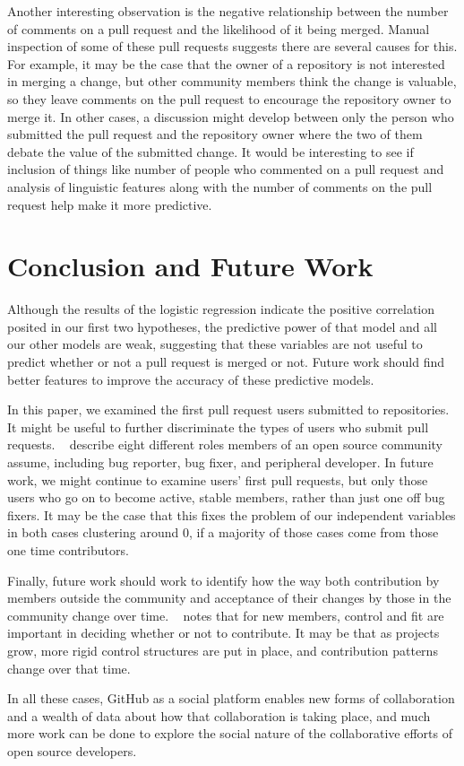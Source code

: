 \documentclass[12pt]{article}
\begin{document}
Another interesting observation is the negative relationship between the number
of comments on a pull request and the likelihood of it being merged. Manual
inspection of some of these pull requests suggests there are several causes for
this. For example, it may be the case that the owner of a repository is not
interested in merging a change, but other community members think the change is
valuable, so they leave comments on the pull request to encourage the repository
owner to merge it. In other cases, a discussion might develop between only the
person who submitted the pull request and the repository owner where the two of
them debate the value of the submitted change. It would be interesting to see if
inclusion of things like number of people who commented on a pull request and
analysis of linguistic features along with the number of comments on the pull
request help make it more predictive.

\section{Conclusion and Future Work}\label{conclusion}
Although the results of the logistic regression indicate the positive
correlation posited in our first two hypotheses, the predictive power of that
model and all our other models are weak, suggesting that these variables are
not useful to predict whether or not a pull request is merged or not. Future
work should find better features to improve the accuracy of these predictive
models.

In this paper, we examined the first pull request users submitted to
repositories. It might be useful to further discriminate the types of users who
submit pull requests. ~\cite{nakakoji_evolution_2002} describe eight different
roles members of an open source community assume, including bug reporter, bug
fixer, and peripheral developer. In future work, we might continue to examine
users' first pull requests, but only those users who go on to become active,
stable members, rather than just one off bug fixers. It may be the case that
this fixes the problem of our independent variables in both cases clustering
around 0, if a majority of those cases come from those one time contributors.

Finally, future work should work to identify how the way both contribution by
members outside the community and acceptance of their changes by those in the
community change over time. ~\cite{shah_motivation_2006} notes that for new
members, control and fit are important in deciding whether or not to contribute.
It may be that as projects grow, more rigid control structures are put in place,
and contribution patterns change over that time.

In all these cases, GitHub as a social platform enables new forms of
collaboration and a wealth of data about how that collaboration is taking
place, and much more work can be done to explore the social nature of the
collaborative efforts of open source developers.



\end{document}
